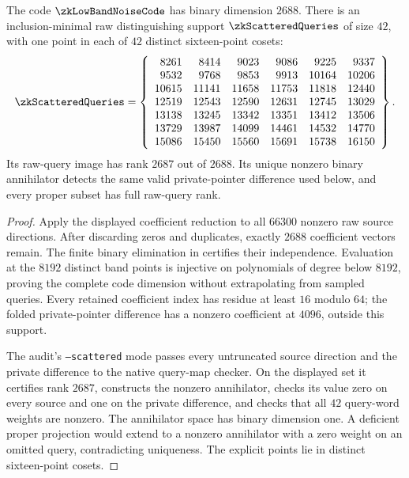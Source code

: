 \begin{proposition}\label{prop:zk-scattered-support}
The code $\zkLowBandNoiseCode$ has binary dimension $2688$. There is an inclusion-minimal raw distinguishing support $\zkScatteredQueries$ of size $42$, with one point in each of $42$ distinct sixteen-point cosets:
\[
 \zkScatteredQueries=\left\{
 \begin{array}{rrrrrr}
 8261&8414&9023&9086&9225&9337\\
 9532&9768&9853&9913&10164&10206\\
 10615&11141&11658&11753&11818&12440\\
 12519&12543&12590&12631&12745&13029\\
 13138&13245&13342&13351&13412&13506\\
 13729&13987&14099&14461&14532&14770\\
 15086&15450&15560&15691&15738&16150
 \end{array}\right\}.
\]
Its raw-query image has rank $2687$ out of $2688$. Its unique nonzero binary annihilator detects the same valid private-pointer difference used below, and every proper subset has full raw-query rank.
\end{proposition}
\begin{proof}
Apply the displayed coefficient reduction to all $66300$ nonzero raw source directions. After discarding zeros and duplicates, exactly $2688$ coefficient vectors remain. The finite binary elimination in  certifies their independence. Evaluation at the $8192$ distinct band points is injective on polynomials of degree below $8192$, proving the complete code dimension without extrapolating from sampled queries. Every retained coefficient index has residue at least $16$ modulo $64$; the folded private-pointer difference has a nonzero coefficient at $4096$, outside this support.

The audit's \texttt{--scattered} mode passes every untruncated source direction and the private difference to the native query-map checker. On the displayed set it certifies rank $2687$, constructs the nonzero annihilator, checks its value zero on every source and one on the private difference, and checks that all $42$ query-word weights are nonzero. The annihilator space has binary dimension one. A deficient proper projection would extend to a nonzero annihilator with a zero weight on an omitted query, contradicting uniqueness. The explicit points lie in distinct sixteen-point cosets.
\end{proof}

